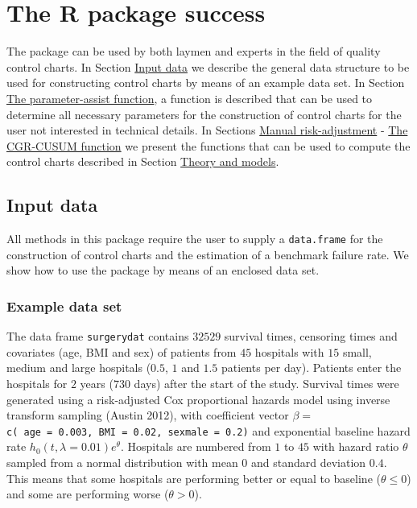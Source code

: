 \hypertarget{sec:Rpkgsuccess}{%
\section{The R package success}\label{sec:Rpkgsuccess}}

The package  can be used by both laymen and experts in the field of quality control charts. In Section \protect\hyperlink{input-data}{Input data} we describe the general data structure to be used for constructing control charts by means of an example data set. In Section \protect\hyperlink{sec:parassistfct}{The parameter-assist function}, a function is described that can be used to determine all necessary parameters for the construction of control charts for the user not interested in technical details. In Sections \protect\hyperlink{sec:ManualRiskAdjustment}{Manual risk-adjustment} - \protect\hyperlink{sec:CGRCUSUMfunction}{The CGR-CUSUM function} we present the functions that can be used to compute the control charts described in Section \protect\hyperlink{sec:TheoryandModels}{Theory and models}.

\hypertarget{input-data}{%
\subsection{Input data}\label{input-data}}

All methods in this package require the user to supply a \texttt{data.frame} for the construction of control charts and the estimation of a benchmark failure rate. We show how to use the  package by means of an enclosed data set.

\hypertarget{example-data-set}{%
\subsubsection{Example data set}\label{example-data-set}}

The data frame \texttt{surgerydat} contains \(32529\) survival times, censoring times and covariates (age, BMI and sex) of patients from \(45\) hospitals with \(15\) small, medium and large hospitals (\(0.5\), \(1\) and \(1.5\) patients per day). Patients enter the hospitals for \(2\) years (\(730\) days) after the start of the study. Survival times were generated using a risk-adjusted Cox proportional hazards model using inverse transform sampling (Austin 2012), with coefficient vector \(\beta =\) \texttt{c(\ age\ =\ 0.003,\ BMI\ =\ 0.02,\ sexmale\ =\ 0.2)} and exponential baseline hazard rate \(h_0(t, \lambda = 0.01) e^\theta\). Hospitals are numbered from \(1\) to \(45\) with hazard ratio \(\theta\) sampled from a normal distribution with mean \(0\) and standard deviation \(0.4\). This means that some hospitals are performing better or equal to baseline (\(\theta \leq 0\)) and some are performing worse (\(\theta > 0\)).

